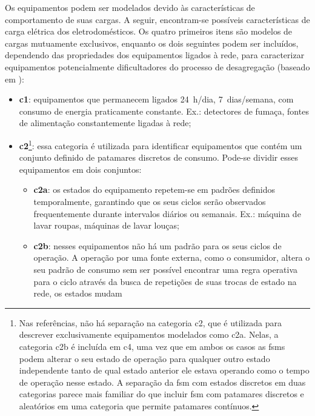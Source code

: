 Os equipamentos podem ser modelados devido às características de
comportamento de suas cargas. A seguir, encontram-se possíveis
características de carga elétrica dos eletrodomésticos. Os quatro
primeiros itens são modelos de cargas mutuamente exclusivos, enquanto
os dois seguintes podem ser incluídos, dependendo das propriedades dos
equipamentos ligados à rede, para caracterizar equipamentos potencialmente
dificultadores do processo de desagregação (baseado em \cite{
nilm_hart_1992_8,nilm_baranski_genetic_base_2003_19,
nilm_zeifman_review_2011,nilm_zeifman_vast_hisample_pdfmerge_2011,
nilm_apresentacao_review_2011,nilm_liang_pt2_2010_40,
nilm_liang_pt1_2010_34}):

\begin{itemize}
\item \textbf{\Gls{c1}}: equipamentos que permanecem
ligados 24~h/dia, 7~dias/semana, com consumo de energia praticamente
constante. Ex.: detectores de fumaça, fontes de alimentação
constantemente ligadas à rede;
\item \textbf{\gls{c2}}\footnote{Nas referências, não há separação na
categoria \gls{c2}, que é utilizada para descrever exclusivamente
equipamentos modelados como \acs{c2a}. Nelas, a categoria
\acs{c2b} é incluída em \acs{c4}, uma vez que em ambos os
casos as \glspl{fsm} podem alterar o seu estado de operação para
qualquer outro estado independente tanto de qual estado anterior ele estava
operando como o tempo de operação nesse estado. A separação da
\gls{fsm} com estados discretos em duas categorias parece mais
familiar do que incluir \gls{fsm} com patamares discretos e
aleatórios em uma categoria que permite patamares
contínuos.\label{fn:subdivisao}}: essa categoria é utilizada
para identificar equipamentos que contém um conjunto definido de
patamares discretos de consumo. Pode-se dividir esses equipamentos 
em dois conjuntos:
\begin{itemize}
\item \textbf{\gls{c2a}}: os estados do equipamento repetem-se em
padrões definidos temporalmente, garantindo que os seus ciclos serão
observados frequentemente durante intervalos diários ou semanais. Ex.:
máquina de lavar roupas, máquinas de lavar louças;
\item \textbf{\gls{c2b}}: nesses equipamentos não há
um padrão para os seus ciclos de operação. A operação por uma fonte
externa, como o consumidor, altera o seu padrão de consumo sem ser
possível encontrar uma regra operativa para o ciclo através da busca
de repetições de suas trocas de estado na rede, os estados mudam

\end{itemize}
\end{itemize}
